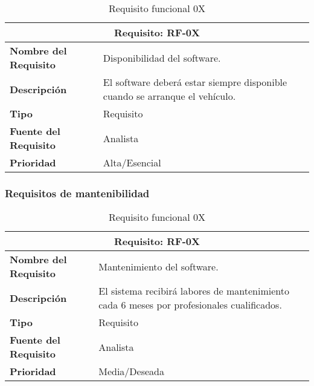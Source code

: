 \begin{table}[H]
\begin{center}
\begin{tabular}{p{} p{7cm}}
\multicolumn{2}{c}{\textbf{Requisito: RF-0X} } \\
\hline \hline
\textbf{Nombre del Requisito} & Disponibilidad del software.\\
\hline
\textbf{Descripción} & El software deberá estar siempre disponible cuando se arranque el vehículo.\\
\hline
\textbf{Tipo} & Requisito  \\
\hline
\textbf{Fuente del Requisito} & Analista  \\
\hline
\textbf{Prioridad} & Alta/Esencial \\ \hline
\end{tabular}
\caption{Requisito funcional 0X}
\label{tab:personal}
\end{center}
\end{table}


\subsubsection{Requisitos de mantenibilidad}

\begin{table}[H]
\begin{center}
\begin{tabular}{p{} p{7cm}}
\multicolumn{2}{c}{\textbf{Requisito: RF-0X} } \\
\hline \hline
\textbf{Nombre del Requisito} & Mantenimiento del software.\\
\hline
\textbf{Descripción} & El sistema recibirá labores de mantenimiento cada 6 meses por profesionales cualificados.\\
\hline
\textbf{Tipo} & Requisito  \\
\hline
\textbf{Fuente del Requisito} & Analista  \\
\hline
\textbf{Prioridad} & Media/Deseada \\ \hline
\end{tabular}
\caption{Requisito funcional 0X}
\label{tab:personal}
\end{center}
\end{table}

